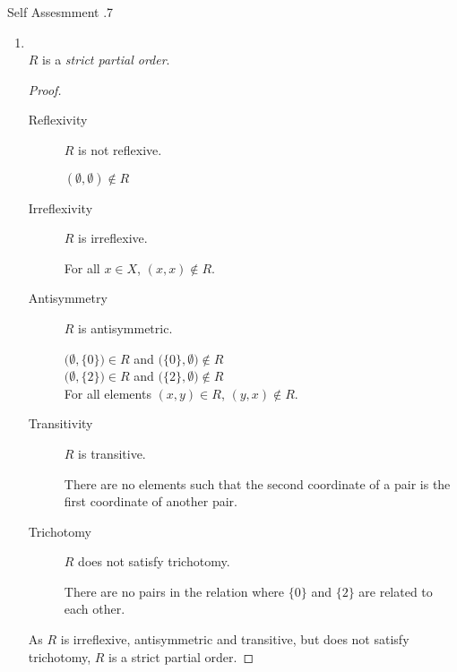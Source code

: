 \documentclass[\main/notes.tex]{subfiles}
\begin{document}
\begin{exercise}{Self Assesmment \thechapter.7}
\begin{enumerate}
							\begin{enumerate}[label=(\alph*)]
								\item {}\\
									$R$ is a \emph{strict partial order}.	
									\begin{proof}
										$ $
										\begin{description}
											\item[Reflexivity] $R$ is not reflexive.
												\begin{subproof}[Counterexample]
													$(\emptyset, \emptyset) \notin R$
												\end{subproof}
											\item[Irreflexivity] $R$ is irreflexive.
												\begin{subproof}
													For all $x \in X$, $(x, x) \notin R$.
												\end{subproof}
											\item[Antisymmetry] $R$ is antisymmetric.
												\begin{subproof}
													$\bigl(\emptyset, \{0\}\bigr) \in R$ and $\bigl(\{0\}, \emptyset\bigr) \notin R$\\
													$\bigl(\emptyset, \{2\}\bigr) \in R$ and $\bigl(\{2\}, \emptyset\bigr) \notin R$\\
													For all elements $(x, y) \in R$, $(y, x) \notin R$.
												\end{subproof}
											\item[Transitivity] $R$ is transitive.
												\begin{subproof}
													There are no elements such that the second coordinate of a pair is the first coordinate of another pair.
												\end{subproof}
											\item[Trichotomy] $R$ does not satisfy trichotomy.
												\begin{subproof}[Counterexample]
													There are no pairs in the relation where $\{0\}$ and $\{2\}$ are related to each other.
												\end{subproof}
										\end{description}
										As $R$ is irreflexive, antisymmetric and transitive, but does not satisfy trichotomy, $R$ is a strict partial order.
									\end{proof}

\end{enumerate}
\end{enumerate}
\end{exercise}
\end{document}
